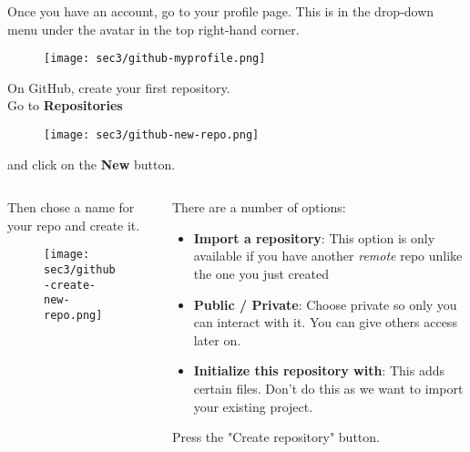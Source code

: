 \begin{frame}[fragile]
\emptyframetitle

  Once you have an account, go to your profile page. This is in the drop-down menu under the avatar in the top right-hand corner.
  \begin{figure}[h]
    \texttt{[image: sec3/github-myprofile.png]}
  \end{figure}

\end{frame}

\begin{frame}[fragile]
\emptyframetitle

  On GitHub, create your first repository.\\[0.25cm]
  Go to \textbf{Repositories}
  \begin{figure}[h]
    \texttt{[image: sec3/github-new-repo.png]}
  \end{figure}
  and click on the \textbf{New} button.

\end{frame}


\begin{frame}[fragile]
\emptyframetitle

  \begin{columns}

    \begin{column}{0.5\textwidth}
      Then chose a name for your repo and create it.
      \begin{figure}[h]
        \texttt{[image: sec3/github-create-new-repo.png]}
      \end{figure}
    \end{column}

    \begin{column}{0.5\textwidth}
      There are a number of options:
      \begin{itemize}
        \item \textbf{Import a repository}: This option is only available if you have another \textit{remote} repo unlike the one you just created
        \item \textbf{Public / Private}: Choose private so only you can interact with it. You can give others access later on.
        \item \textbf{Initialize this repository with}: This adds certain files. Don't do this as we want to import your existing project.
      \end{itemize}
   
\vspace*{0.25cm}   Press the "Create repository" button.
    \end{column}
  \end{columns}

\end{frame}

